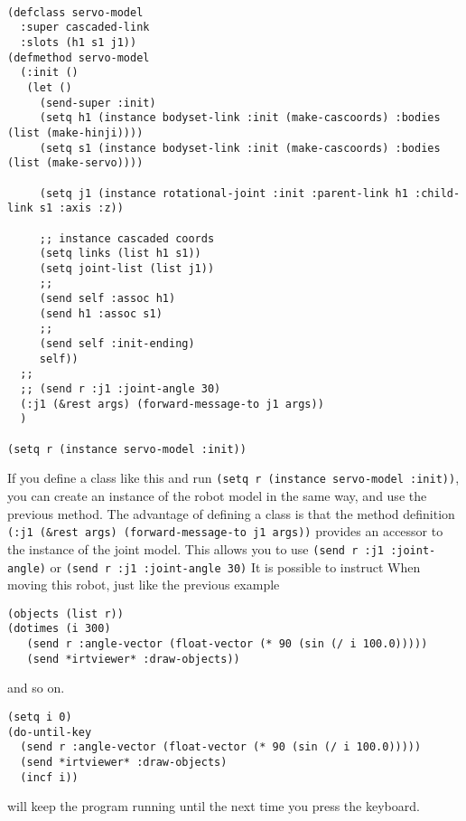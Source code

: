 {\baselineskip=10pt
\begin{verbatim}

(defclass servo-model
  :super cascaded-link
  :slots (h1 s1 j1))
(defmethod servo-model
  (:init ()
   (let ()
     (send-super :init)
     (setq h1 (instance bodyset-link :init (make-cascoords) :bodies (list (make-hinji))))
     (setq s1 (instance bodyset-link :init (make-cascoords) :bodies (list (make-servo))))

     (setq j1 (instance rotational-joint :init :parent-link h1 :child-link s1 :axis :z))

     ;; instance cascaded coords
     (setq links (list h1 s1))
     (setq joint-list (list j1))
     ;;
     (send self :assoc h1)
     (send h1 :assoc s1)
     ;;
     (send self :init-ending)
     self))
  ;;
  ;; (send r :j1 :joint-angle 30)
  (:j1 (&rest args) (forward-message-to j1 args))
  )

(setq r (instance servo-model :init))
\end{verbatim}
}

If you define a class like this and run \verb|(setq r (instance servo-model :init))|, you can create an instance of the robot model in the same way, and use the previous method. The advantage of defining a class is that the method definition \verb|(:j1 (&rest args) (forward-message-to j1 args))| provides an accessor to the instance of the joint model.
This allows you to use \verb|(send r :j1 :joint-angle)| or \verb|(send r :j1 :joint-angle 30)| It is possible to instruct
When moving this robot, just like the previous example

{\baselineskip=10pt
\begin{verbatim}
(objects (list r))
(dotimes (i 300)
   (send r :angle-vector (float-vector (* 90 (sin (/ i 100.0)))))
   (send *irtviewer* :draw-objects))
\end{verbatim}
}

and so on.

{\baselineskip=10pt
\begin{verbatim}
(setq i 0)
(do-until-key
  (send r :angle-vector (float-vector (* 90 (sin (/ i 100.0)))))
  (send *irtviewer* :draw-objects)
  (incf i))
\end{verbatim}
}
will keep the program running until the next time you press the keyboard.

